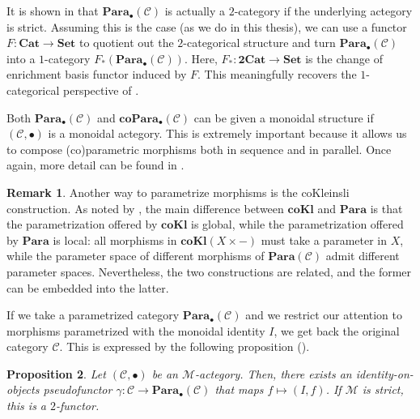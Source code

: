 \documentclass[11pt,a4paper,openright,twoside]{report}
\theoremstyle{plain}
\newtheorem{proposition}{Proposition}
\theoremstyle{definition}
\newtheorem{remark}[proposition]{Remark}
\begin{document}
It is shown in \cite{gavranovic2024fundamental} that $\mathbf{Para}_{\bullet}(\mathcal{C})$ is actually a $2$-category if the underlying actegory is strict. Assuming this is the case (as we do in this thesis), we can use a functor $F: \mathbf{Cat} \to \mathbf{Set}$ to quotient out the $2$-categorical structure and turn $\mathbf{Para}_{\bullet}(\mathcal{C})$ into a $1$-category $F_{*}(\mathbf{Para}_{\bullet}(\mathcal{C}))$. Here, $F_{*}: \mathbf{2Cat} \to \mathbf{Set}$ is the change of enrichment basis functor induced by $F$. This meaningfully recovers the $1$-categorical perspective of \cite{fong2019backprop}.


Both $\mathbf{Para}_{\bullet}(\mathcal{C})$ and $\mathbf{coPara}_{\bullet}(\mathcal{C})$ can be given a monoidal structure if $(\mathcal{C}, \bullet)$ is a monoidal actegory. This is extremely important because it allows us to compose (co)parametric morphisms both in sequence and in parallel. Once again, more detail can be found in \cite{gavranovic2024fundamental}.


\begin{remark}
  Another way to parametrize morphisms is the coKleinsli construction. As noted by \cite{gavranovic2024fundamental}, the main difference between $\mathbf{coKl}$ and $\mathbf{Para}$ is that the parametrization offered by $\mathbf{coKl}$ is global, while the parametrization offered by $\mathbf{Para}$ is local: all morphisms in $\mathbf{coKl}(X \times -)$ must take a parameter in $X$, while the parameter space of different morphisms of $\mathbf{Para}(\mathcal{C})$ admit different parameter spaces. Nevertheless, the two constructions are related, and the former can be embedded into the latter.
\end{remark}


If we take a parametrized category $\mathbf{Para}_\bullet(\mathcal{C})$ and we restrict our attention to morphisms parametrized with the monoidal identity $I$, we get back the original category $\mathcal{C}$. This is expressed by the following proposition (\cite{gavranovic2024fundamental}).

\begin{proposition}
  \label{prop: embeddingth}
  Let $(\mathcal{C}, \bullet)$ be an $\mathcal{M}$-actegory. Then, there exists an identity-on-objects pseudofunctor $\gamma: \mathcal{C} \to \mathbf{Para}_\bullet(\mathcal{C})$ that maps $f \mapsto (I,f)$. If $\mathcal{M}$ is strict, this is a $2$-functor.
\end{proposition}
\end{document}
